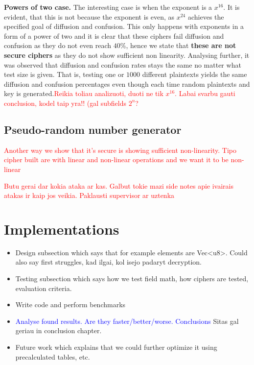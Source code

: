 \documentclass{Resources/UoBLab1}
\theoremstyle{definition}
\begin{document}
\noindent\textbf{Powers of two case.} The interesting case is when the exponent is a $x^{16}$. It is evident, that this is not because the exponent is even, as $x^{24}$ achieves the specified goal of diffusion and confusion. This only happens with exponents in a form of a power of two and it is clear that these ciphers fail diffusion and confusion as they do not even reach $40\%$, hence we state that \textbf{these are not secure ciphers} as they do not show sufficient non linearity. Analysing further, it was observed that diffusion and confusion rates stays the same no matter what test size is given. That is, testing one or $1000$ different plaintexts yields the same diffusion and confusion percentages even though each time random plaintexts and key is generated.\textcolor{red}{Reikia toliau analizuoti, duoti ne tik $x^{16}$. Labai svarbu gauti conclusion, kodel taip yra!! (gal subfields $2^n$?}

\subsection{Pseudo-random number generator}


\textcolor{red}{Another way we show that it's secure is showing sufficient non-linearity. Tipo cipher built are with linear and non-linear operations and we want it to be non-linear}

\textcolor{red}{Butu gerai dar kokia ataka ar kas. Galbut tokie mazi side notes apie ivairais atakas ir kaip jos veikia. Paklausti supervisor ar uztenka}



\section{Implementations}\label{chapter:Implementations}
\begin{itemize}
    \item Design subsection which says that for example elements are Vec<u8>. Could also say first struggles, kad ilgai, kol isejo padaryt decryption.
    \item Testing subsection which says how we test field math, how ciphers are tested, evaluation criteria.
    \item Write code and perform benchmarks
    \item \textcolor{blue}{Analyse found results. Are they faster/better/worse. Conclusions} Sitas gal geriau in conclusion chapter.
    \item Future work which explains that we could further optimize it using precalculated tables, etc.
\end{itemize}
\end{document}
